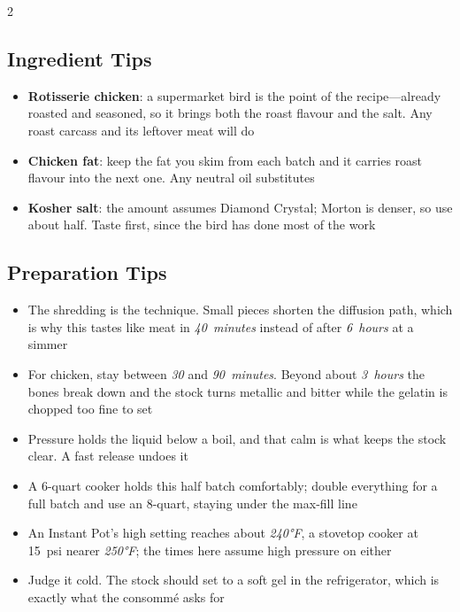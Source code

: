 \documentclass[11pt,letterpaper]{article}
\begin{document}
{\begin{multicols}{2}
\subsection*{Ingredient Tips}
\begin{itemize}
    \item \textbf{Rotisserie chicken}: a supermarket bird is the point of the recipe---already roasted and seasoned, so it brings both the roast flavour and the salt. Any roast carcass and its leftover meat will do
    \item \textbf{Chicken fat}: keep the fat you skim from each batch and it carries roast flavour into the next one. Any neutral oil substitutes
    \item \textbf{Kosher salt}: the amount assumes Diamond Crystal; Morton is denser, so use about half. Taste first, since the bird has done most of the work
\end{itemize}

\subsection*{Preparation Tips}
\begin{itemize}
    \item The shredding is the technique. Small pieces shorten the diffusion path, which is why this tastes like meat in \textit{40~minutes} instead of after \textit{6~hours} at a simmer
    \item For chicken, stay between \textit{30} and \textit{90~minutes}. Beyond about \textit{3~hours} the bones break down and the stock turns metallic and bitter while the gelatin is chopped too fine to set
    \item Pressure holds the liquid below a boil, and that calm is what keeps the stock clear. A fast release undoes it
    \item A 6-quart cooker holds this half batch comfortably; double everything for a full batch and use an 8-quart, staying under the max-fill line
    \item An Instant Pot's high setting reaches about \textit{240°F}, a stovetop cooker at 15~psi nearer \textit{250°F}; the times here assume high pressure on either
    \item Judge it cold. The stock should set to a soft gel in the refrigerator, which is exactly what the consomm\'e asks for
\end{itemize}


\end{multicols}}
\end{document}
